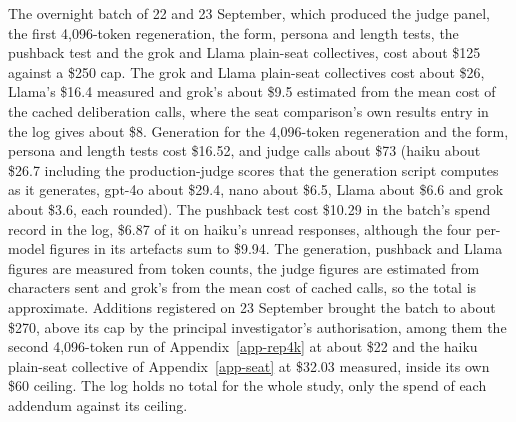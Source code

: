 The overnight batch of 22 and 23 September, which produced the judge panel,
the first 4,096-token regeneration, the form, persona and length tests, the
pushback test and the grok and Llama plain-seat collectives, cost about \$125
against a \$250 cap. The grok and Llama plain-seat collectives cost about
\$26, Llama's \$16.4 measured and
grok's about \$9.5 estimated from the mean cost of the cached deliberation
calls, where the seat comparison's own results entry in the log gives about
\$8. Generation
for the 4,096-token regeneration and the form, persona and length tests cost
\$16.52, and judge calls about \$73 (haiku about \$26.7 including the
production-judge scores that the generation script computes as it generates, gpt-4o
about \$29.4, nano about \$6.5, Llama about \$6.6 and grok about \$3.6, each
rounded).
The pushback test cost \$10.29 in the batch's spend record in the log, \$6.87 of it on haiku's
unread responses, although the four per-model figures in its artefacts sum to
\$9.94. The generation, pushback and Llama figures are measured from token
counts, the judge figures are estimated from characters sent and grok's from
the mean cost of cached calls, so the total is approximate. Additions
registered on 23 September brought the batch to about \$270, above its cap by
the principal investigator's authorisation, among them the second 4,096-token
run of Appendix~\ref{app-rep4k} at about \$22 and the haiku plain-seat
collective of Appendix~\ref{app-seat} at \$32.03 measured, inside its own
\$60 ceiling.
The log holds no total for the whole study, only the spend of each addendum
against its ceiling.


